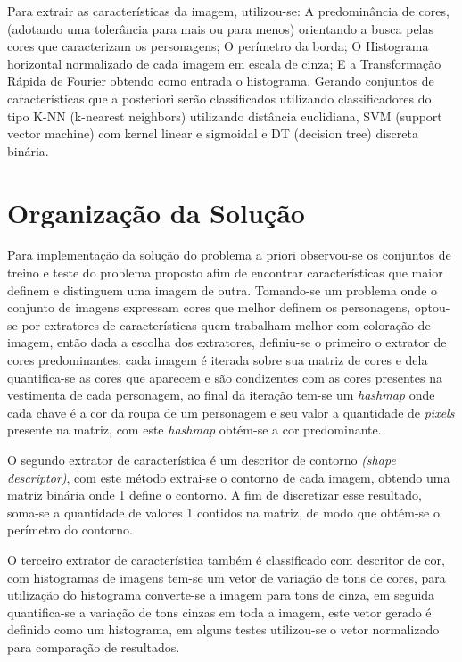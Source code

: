 \documentclass[12pt]{article}
\begin{document}
	Para extrair as características da imagem, utilizou-se: A predominância de cores, (adotando uma tolerância para mais ou para menos) orientando a busca pelas cores que caracterizam os personagens; O perímetro da borda; O Histograma horizontal normalizado de cada imagem em escala de cinza; E a Transformação Rápida de Fourier obtendo como entrada o histograma. Gerando conjuntos de características que a posteriori serão classificados utilizando classificadores do tipo K-NN (k-nearest neighbors) utilizando distância euclidiana, SVM (support vector machine) com kernel linear e sigmoidal e DT (decision tree) discreta binária.

\section{Organização da Solução}\label{sec:solucao}

	Para implementação da solução do problema a priori observou-se os conjuntos de treino e teste do problema proposto afim de encontrar características que maior definem e distinguem uma imagem de outra. Tomando-se um problema onde o conjunto de imagens expressam cores que melhor definem os personagens, optou-se por extratores de características quem trabalham melhor com coloração de imagem, então dada a escolha dos extratores, definiu-se o primeiro o extrator de cores predominantes, cada imagem é iterada sobre sua matriz de cores e dela quantifica-se as cores que aparecem e são condizentes com as cores presentes na vestimenta de cada personagem, ao final da iteração tem-se um \textit{hashmap} onde cada chave é a cor da roupa de um personagem e seu valor a quantidade de \textit{pixels} presente na matriz, com este \textit{hashmap} obtém-se a cor predominante.

	O segundo extrator de característica é um descritor de contorno \textit{(shape descriptor)}, com este método extrai-se o contorno de cada imagem, obtendo uma matriz binária onde 1 define o contorno. A fim de discretizar esse resultado, soma-se a quantidade de valores 1 contidos na matriz, de modo que obtém-se o perímetro do contorno.

	O terceiro extrator de característica também é classificado com descritor de cor, com histogramas de imagens tem-se um vetor de variação de tons de cores, para utilização do histograma converte-se a imagem para tons de cinza, em seguida quantifica-se a variação de tons cinzas em toda a imagem, este vetor gerado é definido como um histograma, em alguns testes utilizou-se o vetor normalizado para comparação de resultados.
\end{document}
